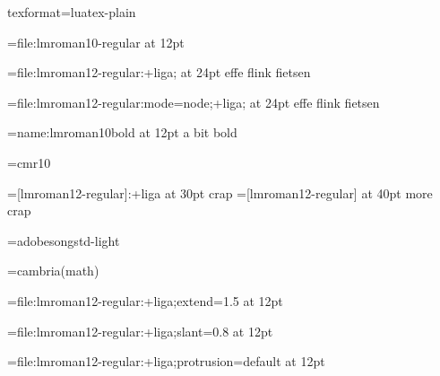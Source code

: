 texformat=luatex-plain



%
%


\font\testa=file:lmroman10-regular                  at 12pt \testa  \par
\font\testb=file:lmroman12-regular:+liga;           at 24pt \testb effe flink fietsen \par
\font\testc=file:lmroman12-regular:mode=node;+liga; at 24pt \testc effe flink fietsen \par
\font\testd=name:lmroman10bold                      at 12pt \testd a bit bold \par

\font\oeps=cmr10

\font\oeps=[lmroman12-regular]:+liga at 30pt \oeps crap
\font\oeps=[lmroman12-regular]       at 40pt \oeps more crap

\font\cidtest=adobesongstd-light

\font\mathtest=cambria(math) {}


\bgroup

    \ifdefined\pdfprotrudechars \pdfprotrudechars \else \protrudechars {} \relax
    \ifdefined\pdfadjustspacing \pdfadjustspacing \else \adjustspacing {} \relax

    \font\testb=file:lmroman12-regular:+liga;extend=1.5         at 12pt \testb  \par
    \font\testb=file:lmroman12-regular:+liga;slant=0.8          at 12pt \testb  \par
    \font\testb=file:lmroman12-regular:+liga;protrusion=default at 12pt \testb  \par

\egroup


